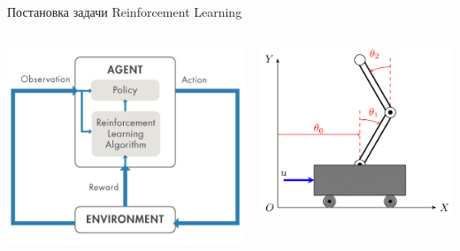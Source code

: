 \documentclass[11pt,aspectratio=169,handout]{beamer}
\begin{document}
\begin{frame}{Постановка задачи Reinforcement Learning}

\begin{columns}

\begin{column}{0.45\textwidth}
\begin{center}
\includegraphics[scale=0.2]{images/rl.jpeg}
\end{center}
\end{column}

\begin{column}{0.45\textwidth}

\begin{small}
\begin{center}
\includegraphics[scale=0.3]{images/catpole.png}
\end{center}
\end{small}

\end{column}
\end{columns}

\end{frame}
\end{document}
